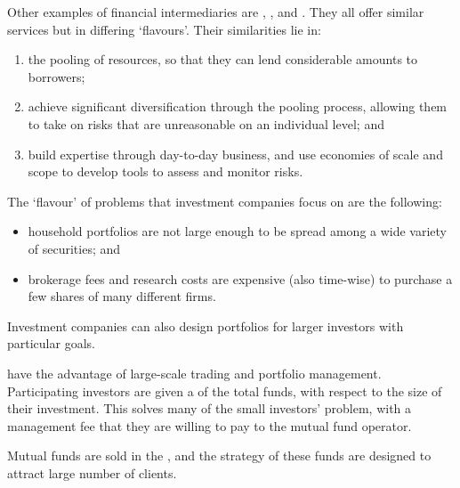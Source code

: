 \documentclass[notoc,notitlepage]{tufte-book}
\begin{document}
Other examples of financial intermediaries are , , and .
They all offer similar services but in differing `flavours'.
Their similarities lie in:
\begin{enumerate}
  \item the pooling of resources, so that they can lend
    considerable amounts to borrowers;
  \item achieve significant diversification through the
    pooling process, allowing them to take on risks
    that are unreasonable on an individual level; and
  \item build expertise through day-to-day business, and
    use economies of scale
    and scope
    to develop tools to assess and monitor risks.
\end{enumerate}

\begin{eg}
  The `flavour' of problems that investment companies focus on
  are the following:
  \begin{itemize}
    \item household portfolios are not large enough to be spread
      among a wide variety of securities; and
    \item brokerage fees and research costs are expensive (also
      time-wise) to purchase a few shares of many different firms.
  \end{itemize}

  Investment companies can also design portfolios for larger investors
  with particular goals.
\end{eg}

\begin{eg}
   have the advantage of large-scale trading
  and portfolio management.
  Participating investors are given a 
  of the total funds, with respect to the size of their investment.
  This solves many of the small investors' problem, with a management
  fee that they are willing to pay to the mutual fund operator.

  Mutual funds are sold in the ,
  and the strategy of these funds are designed to attract large number
  of clients.
\end{eg}
\end{document}
